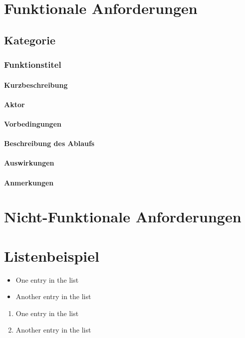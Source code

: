\documentclass[10pt,a4paper]{article}
\begin{document}
    \maketitle
    \newpage
    \tableofcontents
    \newpage

    \section{Funktionale Anforderungen}
    \subsection{Kategorie}
    \subsubsection{\textbf{Funktionstitel}}
    \paragraph{Kurzbeschreibung}
    \paragraph{Aktor}
    \paragraph{Vorbedingungen}
    \paragraph{Beschreibung des Ablaufs}
    \paragraph{Auswirkungen}
    \paragraph{Anmerkungen}

    \section{Nicht-Funktionale Anforderungen}
    \section{Listenbeispiel}
    \begin{itemize}
        \item One entry in the list
        \item Another entry in the list
    \end{itemize}
    \begin{enumerate}
        \item One entry in the list
        \item Another entry in the list
    \end{enumerate}
\end{document}
